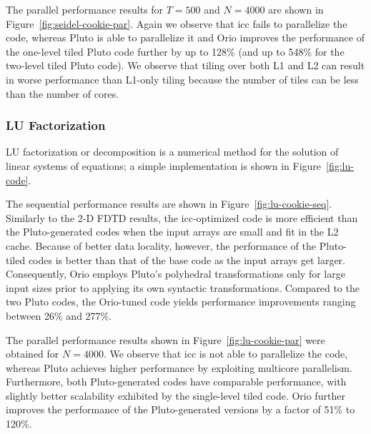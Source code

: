 The parallel performance results for $T=500$ and $N=4000$ are shown in
Figure~\ref{fig:seidel-cookie-par}. Again we observe that icc fails to
parallelize the code, whereas Pluto is able to parallelize it and Orio
improves the performance of the one-level tiled Pluto code further by up to
128\% (and up to 548\% for the two-level tiled Pluto code). We observe that
tiling over both L1 and L2 can result in worse performance than L1-only
tiling because the number of tiles can be less than the number of cores.


\subsubsection{LU Factorization}  
 
LU factorization or decomposition is a numerical method for the
solution of linear systems of equations; a simple implementation is
shown in Figure~\ref{fig:lu-code}.


The sequential performance results are shown in
Figure~\ref{fig:lu-cookie-seq}. Similarly to the 2-D FDTD results, the icc-optimized code is more
efficient than the Pluto-generated codes when the input arrays are small and
fit in the L2 cache. Because of better data locality, however, the
performance of the Pluto-tiled codes is better than that of the base code as
the input arrays get larger. 
Consequently, Orio employs Pluto's polyhedral transformations only for large
input sizes prior to applying its own syntactic transformations. 
Compared to the two Pluto codes, the
Orio-tuned code yields performance improvements ranging between 26\% and 277\%.

The parallel performance results shown in Figure~\ref{fig:lu-cookie-par} were
obtained for $N=4000$. We observe that icc is not able to parallelize the
code, whereas Pluto achieves higher performance by exploiting multicore
parallelism. Furthermore, both Pluto-generated codes have comparable
performance, with slightly better scalability exhibited by the single-level tiled
code. Orio further improves the performance of the Pluto-generated versions
by a factor of 51\% to 120\%.
 
